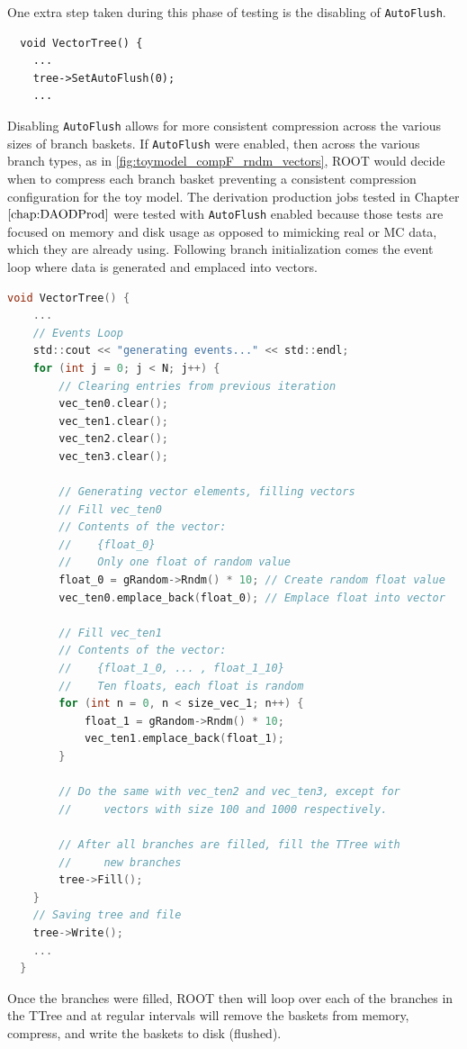 One extra step taken during this phase of testing is the disabling of \verb|AutoFlush|. 
\begin{lstlisting}
  void VectorTree() {
    ...
    tree->SetAutoFlush(0);
    ...
\end{lstlisting}
Disabling \verb|AutoFlush| allows for more consistent compression across the various sizes of branch baskets. 
If \verb|AutoFlush| were enabled, then across the various branch types, as in \ref{fig:toymodel_compF_rndm_vectors}, ROOT would decide when to compress each branch basket preventing a consistent compression configuration for the toy model.  
The derivation production jobs tested in Chapter $\ref{chap:DAODProd}$ were tested with \verb|AutoFlush| enabled because those tests are focused on memory and disk usage as opposed to mimicking real or MC data, which they are already using.
Following branch initialization comes the event loop where data is generated and emplaced into vectors.

\begin{lstlisting}[language=C]  
  void VectorTree() {
    ...
    // Events Loop
    std::cout << "generating events..." << std::endl;
    for (int j = 0; j < N; j++) {
        // Clearing entries from previous iteration
        vec_ten0.clear();
        vec_ten1.clear();
        vec_ten2.clear();
        vec_ten3.clear();

        // Generating vector elements, filling vectors
        // Fill vec_ten0 
        // Contents of the vector:
        //    {float_0}
        //    Only one float of random value
        float_0 = gRandom->Rndm() * 10; // Create random float value
        vec_ten0.emplace_back(float_0); // Emplace float into vector
        
        // Fill vec_ten1
        // Contents of the vector:
        //    {float_1_0, ... , float_1_10}
        //    Ten floats, each float is random
        for (int n = 0, n < size_vec_1; n++) {
            float_1 = gRandom->Rndm() * 10;
            vec_ten1.emplace_back(float_1);
        }

        // Do the same with vec_ten2 and vec_ten3, except for 
        //     vectors with size 100 and 1000 respectively. 
        
        // After all branches are filled, fill the TTree with 
        //     new branches
        tree->Fill();
    }
    // Saving tree and file
    tree->Write();
    ...
  }
\end{lstlisting}
Once the branches were filled, ROOT then will loop over each of the branches in the TTree and at regular intervals will remove the baskets from memory, compress, and write the baskets to disk (flushed).

